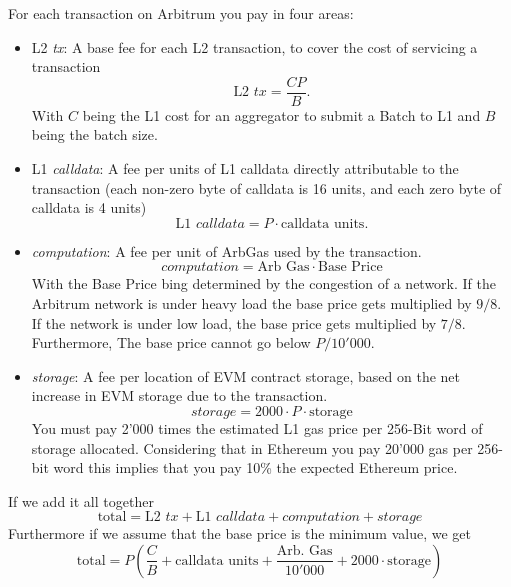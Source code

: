 \documentclass[a4paper,oneside,openright,11pt]{report}
\begin{document}
For each transaction on Arbitrum you pay in four areas:
\begin{itemize}
  \item L2 \textit{tx}: A base fee for each L2 transaction, to cover the cost of servicing a transaction
  \[
		\text{L2 } \textit{tx} = \frac{CP}{B}.
	\] 
	With $C$ being the L1 cost for an aggregator to submit a Batch to L1 and $B$ being the batch size.
	
  \item L1 \textit{calldata}: A fee per units of L1 calldata directly attributable to the transaction 
  (each non-zero byte of calldata is 16 units, and each zero byte of calldata is 4 units)
  \[
		\text{L1 } \textit{calldata} = P \cdot \text{calldata units}.
	\]
	
  \item \textit{computation}: A fee per unit of ArbGas used by the transaction.
  \[
		\textit{computation} = \text{Arb Gas} \cdot \text{Base Price}
	\]
  With the Base Price bing determined by the congestion of a network. If the Arbitrum network is under heavy load
  the base price gets multiplied by $9/8$. If the network is under low load, the base price gets multiplied by $7/8$.
  Furthermore, The base price cannot go below $P/10'000$.
  
  \item \textit{storage}: A fee per location of EVM contract storage, based on the net increase in EVM storage due to the transaction.
  \[
		\textit{storage} = 2000 \cdot P \cdot \text{storage}
	\]
	You must pay 2'000 times the estimated L1 gas price per 256-Bit word of storage allocated. 
	Considering that in Ethereum you pay 20'000 gas per 256-bit word this implies that you pay 10\% 
	the expected Ethereum price.
\end{itemize}

If we add it all together
\[
	\text{total} = \text{L2 } \textit{tx} + \text{L1 } \textit{calldata} + \textit{computation} + \textit{storage}
\]
Furthermore if we assume that the base price is the minimum value, we get
\[
	\text{total} = P(\frac{C}{B} + \text{calldata units} + \frac{\text{Arb. Gas}}{10'000} + 2000 \cdot \text{storage})
\]
\end{document}
